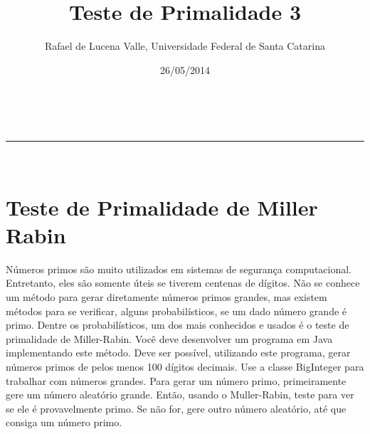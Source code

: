 \documentclass[a4paper,11pt]{article}
\makeatletter
\newcommand{\linia}{\rule{\linewidth}{0.5pt}}
\theoremstyle{mytheor}
\renewcommand{\maketitle}{
\begin{center}
\vspace{2ex}
{\huge \textsc{\@title}}
\vspace{1ex}
\\
\linia\\
\@author \hfill \@date
\vspace{4ex}
\end{center}
}
\makeatother
\begin{document}
\title{Teste de Primalidade\textnumero{} 3}

\author{Rafael de Lucena Valle, Universidade Federal de Santa Catarina}

\date{26/05/2014}

\maketitle

\section*{Teste de Primalidade de Miller Rabin}
Números primos são muito utilizados em sistemas de segurança computacional. Entretanto, eles são somente úteis se tiverem centenas de dígitos. Não se conhece um método para gerar diretamente números primos grandes, mas existem métodos para se verificar, alguns probabilísticos, se um dado número grande é primo. Dentre os probabilísticos, um dos mais conhecidos e usados é o teste de primalidade de Miller-Rabin. Você deve desenvolver um programa em Java implementando este método. Deve ser possível, utilizando este programa, gerar números primos de pelos menos 100 dígitos decimais. Use a classe BigInteger para trabalhar com números grandes. Para gerar um número primo, primeiramente gere um número aleatório grande. Então, usando o Muller-Rabin, teste para ver se ele é provavelmente primo. Se não for, gere outro número aleatório, até que consiga um número primo.
\end{document}
